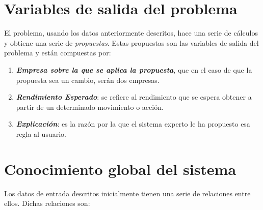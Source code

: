 \documentclass[11pt,openany]{book} %
\begin{document}
\section{Variables de salida del problema}

El problema, usando los datos anteriormente descritos, hace una serie de cálculos y obtiene una serie de \textit{\textcolor{ocre}{propuestas}}. Estas propuestas son las variables de salida del problema y están compuestas por:

\begin{enumerate}[\qquad\color{ocre}{$\bullet$}]
    \item \textbf{\textit{\textcolor{ocre}{Empresa sobre la que se aplica la propuesta}}}, que en el caso de que la propuesta sea un cambio, serán dos empresas.
    \item \textbf{\textit{\textcolor{ocre}{Rendimiento Esperado}}}: se refiere al rendimiento que se espera obtener a partir de un determinado movimiento o acción.
    \item \textbf{\textit{\textcolor{ocre}{Explicación}}}: es la razón por la que el sistema experto le ha propuesto esa regla al usuario.
\end{enumerate}

\section{Conocimiento global del sistema}

Los datos de entrada descritos inicialmente tienen una serie de relaciones entre ellos. Dichas relaciones son:
\end{document}
